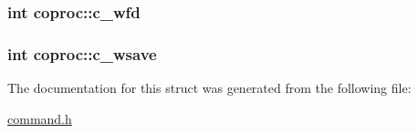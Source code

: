 \subsubsection[{\texorpdfstring{c\+\_\+wfd}{c_wfd}}]{\setlength{\rightskip}{0pt plus 5cm}int coproc\+::c\+\_\+wfd}\hypertarget{structcoproc_a2c12afc95d8231a2627a08351903425c}{}\label{structcoproc_a2c12afc95d8231a2627a08351903425c}
\subsubsection[{\texorpdfstring{c\+\_\+wsave}{c_wsave}}]{\setlength{\rightskip}{0pt plus 5cm}int coproc\+::c\+\_\+wsave}\hypertarget{structcoproc_a3c0bb857aacc8176f88f20075e902fd6}{}\label{structcoproc_a3c0bb857aacc8176f88f20075e902fd6}


The documentation for this struct was generated from the following file\+:\begin{DoxyCompactItemize}
\item 
\hyperlink{command_8h}{command.\+h}\end{DoxyCompactItemize}
